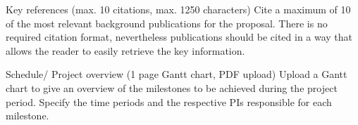 \documentclass[a4paper,12pt]{article}
\begin{document}
Key references (max. 10 citations, max. 1250 characters)
Cite a maximum of 10 of the most relevant background publications for the proposal. There is no required citation format, nevertheless publications should be cited in a way that allows the reader to easily retrieve the key information.

Schedule/ Project overview (1 page Gantt chart, PDF upload)
Upload a Gantt chart to give an overview of the milestones to be achieved during the project period. Specify the time periods and the respective PIs responsible for each milestone.

\end{document}

